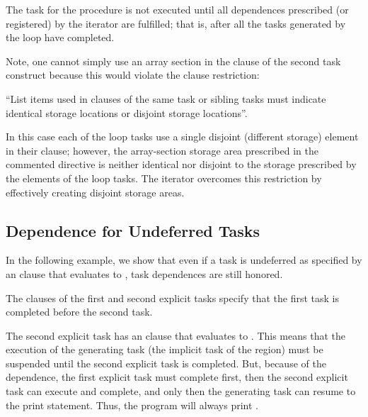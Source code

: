 The task for the  procedure is not executed until all dependences
prescribed (or registered) by the iterator are fulfilled; that is,
after all the tasks generated by the loop have completed.

Note, one cannot simply use an array section in the  clause
of the second task construct because this would violate the  clause restriction:

``List items used in  clauses of the same task or sibling tasks
must indicate identical storage locations or disjoint storage locations''.

In this case each of the loop tasks use a single disjoint (different storage)
element in their  clause; however,
the array-section storage area prescribed in the commented directive is neither
identical nor disjoint to the storage prescribed by the elements of the
loop tasks.  The iterator overcomes this restriction by effectively
creating  disjoint storage areas.



\subsection{Dependence for Undeferred Tasks}
\label{subsec:depend_undefer_task}

In the following example, we show that even if a task is undeferred as specified
by an  clause that evaluates to , task dependences are
still honored.

The  clauses of the first and second explicit tasks specify that
the first task is completed before the second task.

The second explicit task has an  clause that evaluates to .
This means that the execution of the generating task (the implicit task of
the  region) must be suspended until the second explicit task
is completed.
But, because of the dependence, the first explicit task must complete first,
then the second explicit task can execute and complete, and only then 
the generating task can resume to the print statement.
Thus, the program will always print .

\clearpage



